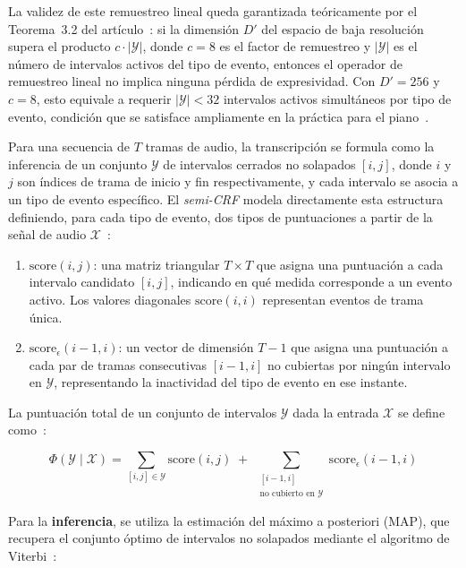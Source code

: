 \documentclass[11pt,spanish,listoffigures,listoftables]{tfgetsinf}
\begin{document}
La validez de este remuestreo lineal queda garantizada teóricamente por el
Teorema~3.2 del artículo~\cite{yan2024transkun}: si la dimensión $D'$ del espacio
de baja resolución supera el producto $c \cdot |\mathcal{Y}|$, donde $c = 8$ es
el factor de remuestreo y $|\mathcal{Y}|$ es el número de intervalos activos del
tipo de evento, entonces el operador de remuestreo lineal no implica ninguna
pérdida de expresividad. Con $D' = 256$ y $c = 8$, esto equivale a requerir
$|\mathcal{Y}| < 32$ intervalos activos simultáneos por tipo de evento, condición
que se satisface ampliamente en la práctica para el piano~\cite{yan2024transkun}.


Para una secuencia de $T$ tramas de audio, la transcripción se formula como la
inferencia de un conjunto $\mathcal{Y}$ de intervalos cerrados no solapados $[i,
j]$, donde $i$ y $j$ son índices de trama de inicio y fin respectivamente, y
cada intervalo se asocia a un tipo de evento específico. El \textit{semi-CRF} modela
directamente esta estructura definiendo, para cada tipo de evento, dos tipos de
puntuaciones a partir de la señal de audio
$\mathcal{X}$~\cite{yan2021semicrf1,yan2024transkun}:

\begin{enumerate}
  \item $\text{score}(i, j)$: una matriz triangular $T \times T$ que asigna una
  puntuación a cada intervalo candidato $[i, j]$, indicando en qué medida
  corresponde a un evento activo. Los valores diagonales $\text{score}(i, i)$
  representan eventos de trama única.
  \item $\text{score}_\epsilon(i-1, i)$: un vector de dimensión $T-1$ que
  asigna una puntuación a cada par de tramas consecutivas $[i-1, i]$ no cubiertas
  por ningún intervalo en $\mathcal{Y}$, representando la inactividad del tipo de
  evento en ese instante.
\end{enumerate}

La puntuación total de un conjunto de intervalos $\mathcal{Y}$ dada la entrada
$\mathcal{X}$ se define como~\cite{yan2024transkun}:

\begin{equation}
  \Phi(\mathcal{Y} \mid \mathcal{X}) =
  \sum_{[i,j] \in \mathcal{Y}} \text{score}(i, j) \;+\;
  \sum_{\substack{[i-1,i] \\ \text{no cubierto en } \mathcal{Y}}}
  \text{score}_\epsilon(i-1, i)
  \label{eq:semicrf_total}
\end{equation}

Para la \textbf{inferencia}, se utiliza la estimación del máximo a posteriori
(MAP), que recupera el conjunto óptimo de intervalos no solapados mediante el
algoritmo de Viterbi~\cite{yan2021semicrf1}:
\end{document}
